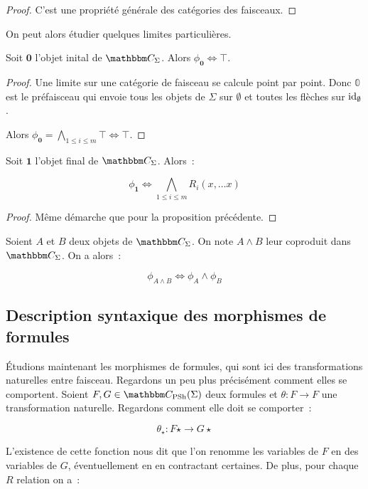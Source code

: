 \begin{proof}
    C'est une propriété générale des catégories des faisceaux.
\end{proof}

On peut alors étudier quelques limites particulières.

\begin{lem}
    Soit $\mathbf{0}$ l'objet inital de $\C_\Sigma$. Alors $\phi_\mathbf{0}\iff\top$.
\end{lem}

\begin{proof}
    Une limite sur une catégorie de faisceau se calcule point par point. Donc $\mathbb{0}$
    est le préfaisceau qui envoie tous les objets de $\Sigma$ sur $\emptyset$ et toutes
    les flèches sur $\operatorname{id}_\emptyset$.

    Alors $\phi_\mathbf{0} = \bigwedge_{1\leq i\leq m}\top \iff \top$.
\end{proof}

\begin{lem}
    Soit $\mathbf{1}$ l'objet final de $\C_\Sigma$. Alors~:

    \[\phi_\mathbf{1} \iff \bigwedge_{1\leq i\leq m}R_i(x,\dots x)\]
\end{lem}

\begin{proof}
    Même démarche que pour la proposition précédente.
\end{proof}

\begin{lem}
    Soient $A$ et $B$ deux objets de $\C_\Sigma$. On note $A\wedge B$ leur coproduit
    dans $\C_\Sigma$. On a alors~:

    \[\phi_{A\wedge B} \iff \phi_A\wedge\phi_B \]
\end{lem}

\subsection{Description syntaxique des morphismes de formules}

Étudions maintenant les morphismes de formules, qui sont ici des transformations
naturelles entre faisceau. Regardons un peu plus précisément comment elles se
comportent. Soient $F,G\in\C_\psh(\Sigma)$ deux formules et $\theta:F\rightarrow F$
une transformation naturelle. Regardons comment elle doit se comporter~:

\[ \theta_\star : F\star \rightarrow G\star \]

L'existence de cette fonction nous dit que l'on renomme les variables de $F$ en des
variables de $G$, éventuellement en en contractant certaines. De plus, pour chaque
$R$ relation on a~:

